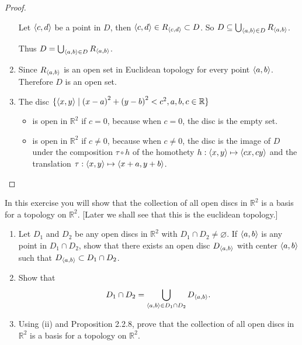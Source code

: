 \begin{proof}
\begin{enumerate}[label={(\roman*)}]
		      Let $\left\langle{c, d}\right\rangle$ be a point in $D$, then $\left\langle{c, d}\right\rangle\in R_{\left\langle{c, d}\right\rangle}\subset D$. So $D\subseteq \bigcup_{\left\langle{a, b}\right\rangle\in D} R_{\left\langle{a, b}\right\rangle}$.

		      Thus $D = \bigcup_{\left\langle{a, b}\right\rangle\in D} R_{\left\langle{a, b}\right\rangle}$.
		\item Since $R_{\left\langle{a, b}\right\rangle}$ is an open set in Euclidean topology for every point $\left\langle{a, b}\right\rangle$. Therefore $D$ is an open set.
		\item The disc $\{ \left\langle{x, y}\right\rangle \mid {(x-a)}^{2} + {(y - b)}^{2} < c^{2}, a, b, c\in\mathbb{R} \}$
		      \begin{itemize}
			      \item is open in $\mathbb{R}^{2}$ if $c = 0$, because when $c = 0$, the disc is the empty set.
			      \item is open in $\mathbb{R}^{2}$ if $c\ne 0$, because when $c\ne 0$, the disc is the image of $D$ under the composition $\tau\circ h$ of the homothety $h: \left\langle{x, y}\right\rangle\mapsto \left\langle{cx, cy}\right\rangle$ and the translation $\tau: \left\langle{x, y}\right\rangle \mapsto \left\langle{x+a, y+b}\right\rangle$.
		      \end{itemize}
	\end{enumerate}
\end{proof}
\newpage

\begin{exercise}
	In this exercise you will show that the collection of all open discs in $\mathbb{R}^{2}$ is a basis for a topology on $\mathbb{R}^{2}$. [Later we shall see that this is the euclidean topology.]
	\begin{enumerate}[label={(\roman*)}]
		\item Let $D_{1}$ and $D_{2}$ be any open discs in $\mathbb{R}^{2}$ with $D_{1}\cap D_{2}\ne \varnothing$. If $\left\langle{a, b}\right\rangle$ is any point in $D_{1}\cap D_{2}$, show that there exists an open disc $D_{\left\langle{a,b}\right\rangle}$ with center $\left\langle{a, b}\right\rangle$ such that $D_{\left\langle{a, b}\right\rangle}\subset D_{1}\cap D_{2}$.
		\item Show that
		      \[
			      D_{1}\cap D_{2} = \bigcup_{\left\langle{a, b}\right\rangle\in D_{1}\cap D_{2}} D_{\left\langle{a, b}\right\rangle}.
		      \]
		\item Using (ii) and Proposition 2.2.8, prove that the collection of all open discs in $\mathbb{R}^{2}$ is a basis for a topology on $\mathbb{R}^{2}$.
	\end{enumerate}
\end{exercise}

